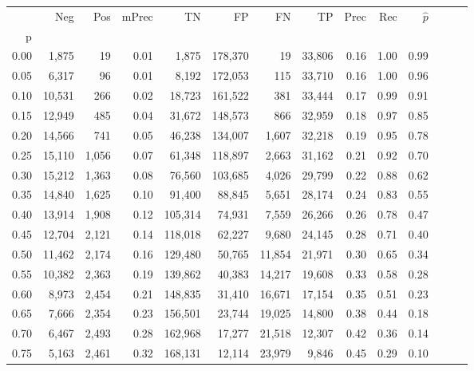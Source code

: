 \begin{tabular}{rrrrrrrrrrrrrr}
\toprule
{} &     Neg &    Pos & mPrec &       TN &       FP &      FN &      TP &  Prec &   Rec & $\hat{p}$ \\
p    &         &        &       &          &          &         &         &       &       &           \\
\midrule
0.00 &   1,875 &     19 &  0.01 &    1,875 &  178,370 &      19 &  33,806 &  0.16 &  1.00 &      0.99 \\
0.05 &   6,317 &     96 &  0.01 &    8,192 &  172,053 &     115 &  33,710 &  0.16 &  1.00 &      0.96 \\
0.10 &  10,531 &    266 &  0.02 &   18,723 &  161,522 &     381 &  33,444 &  0.17 &  0.99 &      0.91 \\
0.15 &  12,949 &    485 &  0.04 &   31,672 &  148,573 &     866 &  32,959 &  0.18 &  0.97 &      0.85 \\
0.20 &  14,566 &    741 &  0.05 &   46,238 &  134,007 &   1,607 &  32,218 &  0.19 &  0.95 &      0.78 \\
0.25 &  15,110 &  1,056 &  0.07 &   61,348 &  118,897 &   2,663 &  31,162 &  0.21 &  0.92 &      0.70 \\
0.30 &  15,212 &  1,363 &  0.08 &   76,560 &  103,685 &   4,026 &  29,799 &  0.22 &  0.88 &      0.62 \\
0.35 &  14,840 &  1,625 &  0.10 &   91,400 &   88,845 &   5,651 &  28,174 &  0.24 &  0.83 &      0.55 \\
0.40 &  13,914 &  1,908 &  0.12 &  105,314 &   74,931 &   7,559 &  26,266 &  0.26 &  0.78 &      0.47 \\
0.45 &  12,704 &  2,121 &  0.14 &  118,018 &   62,227 &   9,680 &  24,145 &  0.28 &  0.71 &      0.40 \\
0.50 &  11,462 &  2,174 &  0.16 &  129,480 &   50,765 &  11,854 &  21,971 &  0.30 &  0.65 &      0.34 \\
0.55 &  10,382 &  2,363 &  0.19 &  139,862 &   40,383 &  14,217 &  19,608 &  0.33 &  0.58 &      0.28 \\
0.60 &   8,973 &  2,454 &  0.21 &  148,835 &   31,410 &  16,671 &  17,154 &  0.35 &  0.51 &      0.23 \\
0.65 &   7,666 &  2,354 &  0.23 &  156,501 &   23,744 &  19,025 &  14,800 &  0.38 &  0.44 &      0.18 \\
0.70 &   6,467 &  2,493 &  0.28 &  162,968 &   17,277 &  21,518 &  12,307 &  0.42 &  0.36 &      0.14 \\
0.75 &   5,163 &  2,461 &  0.32 &  168,131 &   12,114 &  23,979 &   9,846 &  0.45 &  0.29 &      0.10 \\

\end{tabular}
